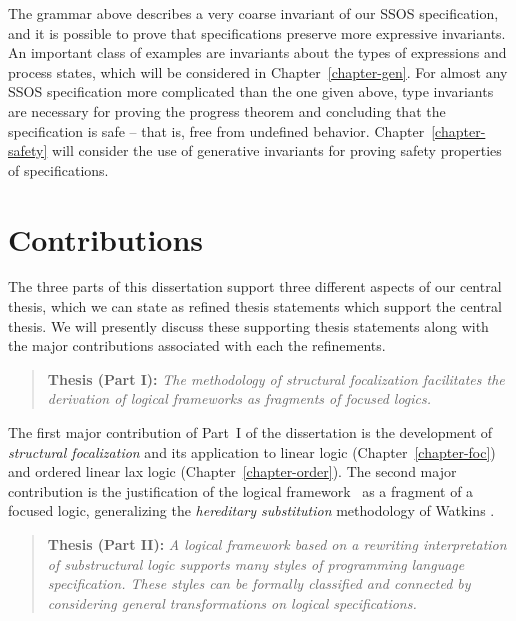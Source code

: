 The grammar above describes a very coarse invariant of our SSOS
specification, and it is possible to prove that specifications
preserve more expressive invariants. An important class of examples
are invariants about the types of expressions and process states,
which will be considered in Chapter~\ref{chapter-gen}.  For almost any
SSOS specification more complicated than the one given above, type
invariants are necessary for proving the progress theorem and
concluding that the specification is safe -- that is, free from
undefined behavior.  Chapter~\ref{chapter-safety} will consider the
use of generative invariants for proving safety properties of
specifications.

\section{Contributions}

The three parts of this dissertation support three different
aspects of our central thesis, which we can state as refined thesis
statements which support the central thesis. We will presently discuss
these supporting thesis statements along with the major contributions
associated with each the refinements.

\smallskip
\begin{quote} {\bf Thesis (Part I):} {\it The methodology of
    structural focalization facilitates the derivation of logical
    frameworks as fragments of focused logics.}
\end{quote}
\smallskip

\noindent
The first major contribution of Part~I of the dissertation is the
development of {\it structural focalization} and its application
to linear logic (Chapter~\ref{chapter-foc}) and ordered linear lax
logic (Chapter~\ref{chapter-order}). The second major contribution is
the justification of the logical framework \sls~as a fragment of a
focused logic, generalizing the {\it hereditary substitution}
methodology of Watkins \cite{watkins02concurrent}.

\smallskip
\begin{quote} 
  {\bf Thesis (Part II):} {\it A logical framework based on a rewriting
  interpretation of substructural logic supports many styles of
  programming language specification. These styles can be formally
  classified and connected by considering general transformations on
  logical specifications.}
\end{quote} 
\smallskip

